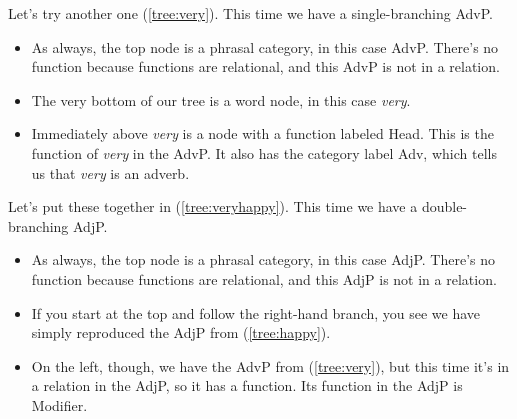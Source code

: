 \ea {}\label{tree:happy}
\z


Let's try another one (\ref{tree:very}). This time we have a single-branching AdvP.
\begin{itemize}[noitemsep]
    \item As always, the top node is a phrasal category, in this case AdvP. There's no function because functions are relational, and this AdvP is not in a relation.
    \item The very bottom of our tree is a word node, in this case \textit{very}.
    \item Immediately above \textit{very} is a node with a function labeled Head. This is the function of \textit{very} in the AdvP. It also has the category label Adv, which tells us that \textit{very} is an adverb.
\end{itemize}

\ea {}\label{tree:very}
\z



Let's put these together in (\ref{tree:veryhappy}). This time we have a double-branching AdjP.
\begin{itemize}[noitemsep]
    \item As always, the top node is a phrasal category, in this case AdjP. There's no function because functions are relational, and this AdjP is not in a relation.
    \item If you start at the top and follow the right-hand branch, you see we have simply reproduced the AdjP from (\ref{tree:happy}).
    \item On the left, though, we have the AdvP from (\ref{tree:very}), but this time it's in a relation in the AdjP, so it has a function. Its function in the AdjP is Modifier.
\end{itemize}

